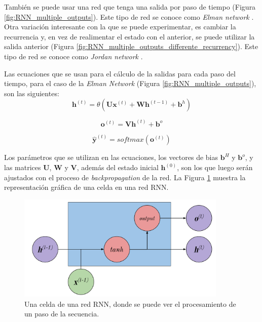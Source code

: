 \documentclass[spanish]{article}
\theoremstyle{definition}
\theoremstyle{remark}
\numberwithin{equation}{section}
\numberwithin{equation}{section} %
\begin{document}
También se puede usar una red que tenga una salida por paso de tiempo (Figura \ref{fig:RNN_multiple_outputs}). Este tipo de red se conoce como \textit{Elman network} \cite{elman1990finding}. Otra variación interesante con la que se puede experimentar, es cambiar la recurrencia y, en vez de realimentar el estado con el anterior, se puede utilizar la salida anterior (Figura \ref{fig:RNN_multiple_outputs_differente_recurrency}). Este tipo de red se conoce como \textit{Jordan network} \cite{jordan1997serial}.  \par

Las ecuaciones que se usan para el cálculo de la salidas para cada paso del tiempo, para el caso de la \textit{Elman Network} \cite{elman1990finding} (Figura \ref{fig:RNN_multiple_outputs}), son las siguientes:
\begin{equation}
\label{eq_rnn_vanilla_h}
\boldsymbol{h}^{(t)}=\theta(\boldsymbol{U}\boldsymbol{x}^{(t)}+\boldsymbol{W}\boldsymbol{h}^{(t-1)} +\boldsymbol{b}^h)
\end{equation} \par
\begin{equation}
\label{eq_rnn_vanilla_o}
\boldsymbol{o}^{(t)}=\boldsymbol{V}\boldsymbol{h}^{(t)}+\boldsymbol{b}^o
\end{equation} \par
\begin{equation}
\label{eq_rnn_vanilla_y}
\boldsymbol{\hat{y}}^{(t)}=softmax(\boldsymbol{o}^{(t)})
\end{equation} \par
 Los parámetros que se utilizan en las ecuaciones, los vectores de bias $\textbf{b}^H$ y $\boldsymbol{b}^o$, y las matrices $\boldsymbol{U}$, $\boldsymbol{W}$ y $\boldsymbol{V}$, además del estado inicial $\boldsymbol{h}^{(0)}$, son los que luego serán ajustados con el proceso de \textit{backpropagation} de la red. La Figura \ref{fig:RNN_cell} muestra la representación gráfica de una celda en una red RNN. 
\begin{figure}[H]
 \centering
 \includegraphics[width=10cm]{img/RNN_Cell_Schema.png}
\caption[Diagrama Celda RNN]{\footnotesize{ Una celda de una red RNN, donde se puede ver el procesamiento de un paso de la secuencia.  }}
\label{fig:RNN_cell}
\end{figure}
 
\end{document}

